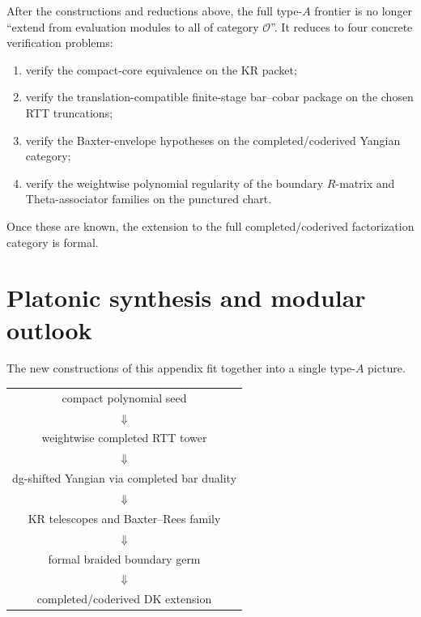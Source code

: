 \begin{corollary}
\ClaimStatusProvedHere
\label{cor:what-remains-after-present-appendix}
After the constructions and reductions above, the full type-$A$ frontier
is no longer ``extend from evaluation modules to all of category
$\mathcal O$''.  It reduces to four concrete verification problems:
\begin{enumerate}
    \item verify the compact-core equivalence on the KR packet;
    \item verify the translation-compatible finite-stage bar--cobar
    package on the chosen RTT truncations;
    \item verify the Baxter-envelope hypotheses on the completed/coderived
    Yangian category;
    \item verify the weightwise polynomial regularity of the boundary
    $R$-matrix and Theta-associator families on the punctured chart.
\end{enumerate}
Once these are known, the extension to the full completed/coderived
factorization category is formal.
\end{corollary}

\section{Platonic synthesis and modular outlook}
\label{sec:typeA-platonic-synthesis-outlook}

The new constructions of this appendix fit together into a single type-$A$
picture.

\begin{center}
\begin{tabular}{c}
compact polynomial seed \\
$\Downarrow$ \\
weightwise completed RTT tower \\
$\Downarrow$ \\
dg-shifted Yangian via completed bar duality \\
$\Downarrow$ \\
KR telescopes and Baxter--Rees family \\
$\Downarrow$ \\
formal braided boundary germ \\
$\Downarrow$ \\
completed/coderived DK extension
\end{tabular}
\end{center}

